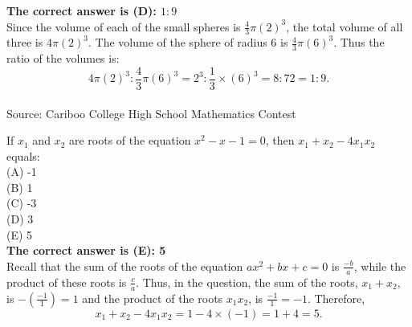 \documentclass{article}
\begin{document}
\textbf{The correct answer is (D): $1:9$}\\[1 ex]
Since the volume of each of the small spheres is $\frac{4}{3}\pi (2)^{3}$, the total volume of all three is $4\pi(2)^{3}$. The volume of the sphere of radius 6 is $\frac{4}{3}\pi(6)^{3}$. Thus the ratio of the volumes is:
\begin{equation*}
4\pi(2)^{3}:\frac{4}{3}\pi(6)^{3}=2^{3}:\frac{1}{3}\times(6)^{3}=8:72=1:9.
\end{equation*}
\\[5 ex]

\scriptsize
Source: Cariboo College High School Mathematics Contest

\normalsize
If $x_1$ and $x_2$ are roots of the equation $x^{2}-x-1=0$, then $x_{1}+x_{2}-4x_{1}x_{2}$ equals:\\
(A) -1\\
(B) 1\\
(C) -3\\
(D) 3\\
(E) 5\\


\textbf{The correct answer is (E): 5}\\[1 ex]
Recall that the sum of the roots of the equation $ax^{2}+bx+c=0$ is $\frac{-b}{a}$, while the product of these roots is $\frac{c}{a}$. Thus, in the question, the sum of the roots, $x_{1}+x_{2}$, is $-(\frac{-1}{1})=1$ and the product of the roots $x_{1}x_{2}$, is $\frac{-1}{1}=-1$. Therefore,
\begin{equation*}
x_{1}+x_{2}-4x_{1}x_{2}=1-4\times(-1)=1+4=5.
\end{equation*}
\\[5 ex]
\end{document}
